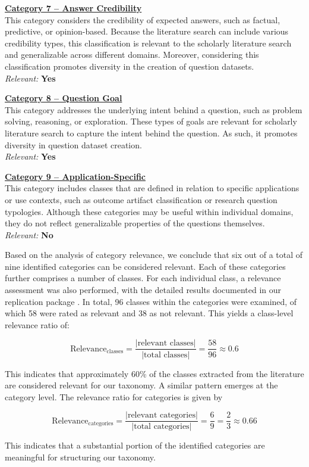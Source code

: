 \hyperref[enum:cluster_7]{\textbf{Category 7 – Answer Credibility}} \\
This category considers the credibility of expected answers, such as factual, predictive, or opinion-based. Because the literature search can include various credibility types, this classification is relevant to the scholarly literature search and generalizable across different domains. Moreover, considering this classification promotes diversity in the creation of question datasets. \\
\textit{Relevant:} \textbf{Yes} 

\hyperref[enum:cluster_8]{\textbf{Category 8 – Question Goal}} \\
This category addresses the underlying intent behind a question, such as problem solving, reasoning, or exploration. These types of goals are relevant for scholarly literature search to capture the intent behind the question. As such, it promotes diversity in question dataset creation. \\
\textit{Relevant:} \textbf{Yes}

\hyperref[enum:cluster_9]{\textbf{Category 9 – Application-Specific}} \\
This category includes classes that are defined in relation to specific applications or use contexts, such as outcome artifact classification or research question typologies. Although these categories may be useful within individual domains, they do not reflect generalizable properties of the questions themselves. \\
\textit{Relevant:} \textbf{No}

Based on the analysis of category relevance, we conclude that six out of a total of nine identified categories can be considered relevant. Each of these categories further comprises a number of classes. For each individual class, a relevance assessment was also performed, with the detailed results documented in our replication package \cite{schneider_replication_2025}. In total, 96 classes within the categories were examined, of which 58 were rated as relevant and 38 as not relevant. This yields a class-level relevance ratio of:

\[
\text{Relevance}_\text{classes} = \frac{|\text{relevant classes}|}{|\text{total classes}|} = \frac{58}{96} \approx 0.6
\]

This indicates that approximately 60\% of the classes extracted from the literature are considered relevant for our taxonomy. A similar pattern emerges at the category level. The relevance ratio for categories is given by

\[
\text{Relevance}_\text{categories} = \frac{|\text{relevant categories}|}{|\text{total categories}|} = \frac{6}{9} = \frac{2}{3} \approx 0.66
\]

This indicates that a substantial portion of the identified categories are meaningful for structuring our taxonomy.
